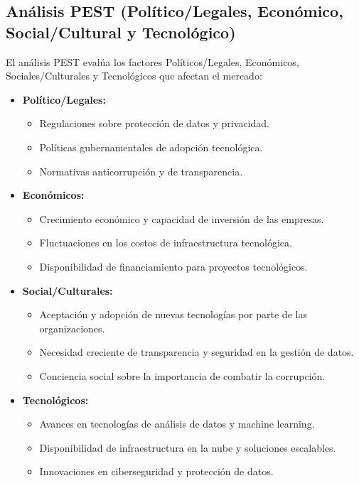 \documentclass[a4paper,12pt]{article}
\begin{document}
\subsection{Análisis PEST (Político/Legales, Económico, Social/Cultural y Tecnológico)}
El análisis PEST evalúa los factores Políticos/Legales, Económicos, Sociales/Culturales y Tecnológicos que afectan el mercado:

\begin{itemize}
    \item \textbf{Político/Legales:}
    \begin{itemize}
        \item Regulaciones sobre protección de datos y privacidad.
        \item Políticas gubernamentales de adopción tecnológica.
        \item Normativas anticorrupción y de transparencia.
    \end{itemize}
    \item \textbf{Económicos:}
    \begin{itemize}
        \item Crecimiento económico y capacidad de inversión de las empresas.
        \item Fluctuaciones en los costos de infraestructura tecnológica.
        \item Disponibilidad de financiamiento para proyectos tecnológicos.
    \end{itemize}
    \item \textbf{Social/Culturales:}
    \begin{itemize}
        \item Aceptación y adopción de nuevas tecnologías por parte de las organizaciones.
        \item Necesidad creciente de transparencia y seguridad en la gestión de datos.
        \item Conciencia social sobre la importancia de combatir la corrupción.
    \end{itemize}
    \item \textbf{Tecnológicos:}
    \begin{itemize}
        \item Avances en tecnologías de análisis de datos y machine learning.
        \item Disponibilidad de infraestructura en la nube y soluciones escalables.
        \item Innovaciones en ciberseguridad y protección de datos.
    \end{itemize}
\end{itemize}
\end{document}
